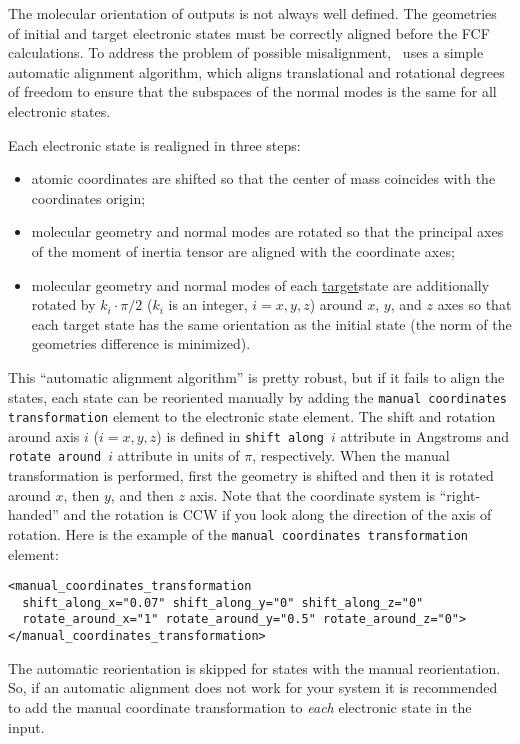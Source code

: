 \documentclass[11pt]{article}
\begin{document}
The molecular orientation of \ai outputs is not always well defined. 
The geometries of initial 
and target electronic states must be correctly aligned before the FCF calculations.
To address the problem of possible misalignment,
\ezFCF\ uses a simple automatic alignment algorithm, which aligns translational and rotational
degrees of freedom to ensure that the subspaces of the normal modes is the same for all electronic states.

Each electronic state is realigned in three steps:
\begin{itemize}
\item atomic coordinates are shifted so that the center of mass coincides with the coordinates origin;
\item molecular geometry and normal modes are rotated so that the principal axes of the moment of inertia 
tensor are aligned with the coordinate axes;
\item molecular geometry and normal modes of each \ul{target}{state} are additionally rotated by 
$k_i\cdot\pi/2$ ($k_i$ is an integer, $i={x,y,z}$) around $x$, $y$, and $z$ axes so that each target state has the same orientation 
as the initial state (the norm of the geometries difference is minimized).
\end{itemize}

This ``automatic alignment algorithm'' is pretty robust, but if it fails to align the states, each state can be reoriented 
manually by adding the {\tt manual coordinates transformation} element to the 
electronic state element.
The shift and rotation around axis $i$ ($i={x,y,z}$) is defined in {\tt shift along $i$} attribute in Angstroms
and {\tt rotate around $i$} attribute in units of $\pi$, respectively. 
When the manual transformation is performed, first the geometry is shifted and then it is rotated around $x$, then $y$, and then $z$ axis. 
Note that the coordinate system is ``right-handed'' and the rotation is CCW if you look along the 
direction of the axis of rotation. 
Here is the example of the {\tt manual coordinates transformation} element:
\begin{lstlisting}[frame=single,framerule=0pt]
<manual_coordinates_transformation 
  shift_along_x="0.07" shift_along_y="0" shift_along_z="0" 
  rotate_around_x="1" rotate_around_y="0.5" rotate_around_z="0">
</manual_coordinates_transformation>
\end{lstlisting}
The automatic reorientation is skipped for states with the manual reorientation.
So, if an automatic alignment does not work for your system it is recommended to add the
manual coordinate transformation to {\em each} electronic state in the \xml input.
\end{document}
